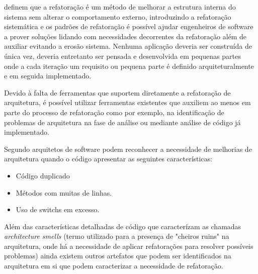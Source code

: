 \cite{babar2013agile} definem que a refatoração é um método de melhorar a estrutura interna do sistema sem alterar o comportamento externo, introduzindo a refatoração sistemática e os padrões de refatoração é possível ajudar engenheiros de software a prover soluções lidando com necessidades decorrentes da refatoração além de auxiliar evitando a erosão sistema.
Nenhuma aplicação deveria ser construída de única vez,  deveria entretanto ser pensada e desenvolvida em pequenas partes onde a cada iteração um requisito ou pequena parte é definido arquiteturalmente e em seguida implementado.

Devido à falta de ferramentas que suportem diretamente a refatoração de arquitetura, é possível utilizar ferramentas existentes que auxiliem ao menos em parte do processo de refatoração como por exemplo, na identificação de problemas de arquitetura na fase de análise ou mediante análise de código já implementado.

Segundo \cite{babar2013agile} arquitetos de software podem reconhecer a necessidade de melhorias de arquitetura quando o código apresentar as seguintes características: 
    \begin{itemize}
        \item Código duplicado
        \item Métodos com muitas de linhas.
        \item Uso de switchs em excesso.
    \end{itemize}

Além das características detalhadas de código que caracterízam as chamadas \textit{architecture smells} (termo utilizado para a presença de "cheiros ruins" na arquitetura, onde há a necessidade de aplicar refatorações para resolver possíveis problemas) ainda existem outros artefatos que podem ser identificados na arquitetura em si que podem caracterizar a necessidade de refatoração.

